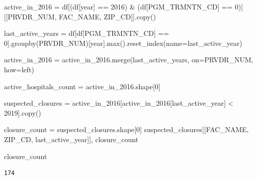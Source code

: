 \documentclass[
  letterpaper,
  DIV=11,
  numbers=noendperiod]{scrartcl}
\newenvironment{Shaded}{\begin{snugshade}}{\end{snugshade}}
\newcommand{\BuiltInTok}[1]{\textcolor[rgb]{0.00,0.23,0.31}{#1}}
\newcommand{\DecValTok}[1]{\textcolor[rgb]{0.68,0.00,0.00}{#1}}
\newcommand{\NormalTok}[1]{\textcolor[rgb]{0.00,0.23,0.31}{#1}}
\newcommand{\OperatorTok}[1]{\textcolor[rgb]{0.37,0.37,0.37}{#1}}
\newcommand{\StringTok}[1]{\textcolor[rgb]{0.13,0.47,0.30}{#1}}
\begin{document}
\begin{Shaded}
\begin{Highlighting}[]
\NormalTok{active\_in\_2016 }\OperatorTok{=}\NormalTok{ df[(df[}\StringTok{\textquotesingle{}year\textquotesingle{}}\NormalTok{] }\OperatorTok{==} \DecValTok{2016}\NormalTok{) }\OperatorTok{\&}\NormalTok{ (df[}\StringTok{\textquotesingle{}PGM\_TRMNTN\_CD\textquotesingle{}}\NormalTok{] }\OperatorTok{==} \DecValTok{0}\NormalTok{)][[}\StringTok{\textquotesingle{}PRVDR\_NUM\textquotesingle{}}\NormalTok{, }\StringTok{\textquotesingle{}FAC\_NAME\textquotesingle{}}\NormalTok{, }\StringTok{\textquotesingle{}ZIP\_CD\textquotesingle{}}\NormalTok{]].copy()}

\NormalTok{last\_active\_years }\OperatorTok{=}\NormalTok{ df[df[}\StringTok{\textquotesingle{}PGM\_TRMNTN\_CD\textquotesingle{}}\NormalTok{] }\OperatorTok{==} \DecValTok{0}\NormalTok{].groupby(}\StringTok{\textquotesingle{}PRVDR\_NUM\textquotesingle{}}\NormalTok{)[}\StringTok{\textquotesingle{}year\textquotesingle{}}\NormalTok{].}\BuiltInTok{max}\NormalTok{().reset\_index(name}\OperatorTok{=}\StringTok{\textquotesingle{}last\_active\_year\textquotesingle{}}\NormalTok{)}

\NormalTok{active\_in\_2016 }\OperatorTok{=}\NormalTok{ active\_in\_2016.merge(last\_active\_years, on}\OperatorTok{=}\StringTok{\textquotesingle{}PRVDR\_NUM\textquotesingle{}}\NormalTok{, how}\OperatorTok{=}\StringTok{\textquotesingle{}left\textquotesingle{}}\NormalTok{)}

\NormalTok{active\_hospitals\_count }\OperatorTok{=}\NormalTok{ active\_in\_2016.shape[}\DecValTok{0}\NormalTok{]}

\NormalTok{suspected\_closures }\OperatorTok{=}\NormalTok{ active\_in\_2016[active\_in\_2016[}\StringTok{\textquotesingle{}last\_active\_year\textquotesingle{}}\NormalTok{] }\OperatorTok{\textless{}} \DecValTok{2019}\NormalTok{].copy()}

\NormalTok{closure\_count }\OperatorTok{=}\NormalTok{ suspected\_closures.shape[}\DecValTok{0}\NormalTok{]}
\NormalTok{suspected\_closures[[}\StringTok{\textquotesingle{}FAC\_NAME\textquotesingle{}}\NormalTok{, }\StringTok{\textquotesingle{}ZIP\_CD\textquotesingle{}}\NormalTok{, }\StringTok{\textquotesingle{}last\_active\_year\textquotesingle{}}\NormalTok{]], closure\_count}

\NormalTok{closure\_count}
\end{Highlighting}
\end{Shaded}

\begin{verbatim}
174
\end{verbatim}
\end{document}
